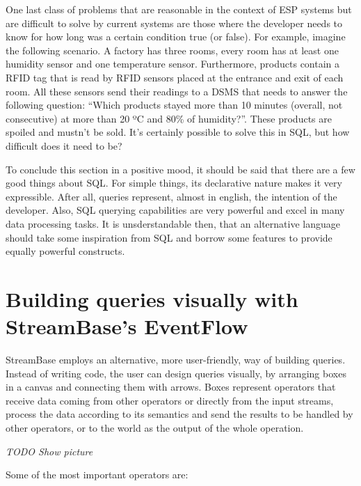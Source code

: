 \documentclass{report}
\begin{document}
One last class of problems that are reasonable in the context of ESP systems but are difficult to solve by current systems are those where the developer needs to know for how long was a certain condition true (or false). For example, imagine the following scenario. A factory has three rooms, every room has at least one humidity sensor and one temperature sensor. Furthermore, products contain a RFID tag that is read by RFID sensors placed at the entrance and exit of each room. All these sensors send their readings to a DSMS that needs to answer the following question: ``Which products stayed more than 10 minutes (overall, not consecutive) at more than 20 ºC and 80\% of humidity?''. These products are spoiled and mustn't be sold. It's certainly possible to solve this in SQL, but how difficult does it need to be?

To conclude this section in a positive mood, it should be said that there are a few good things about SQL. For simple things, its declarative nature makes it very expressible. After all, queries represent, almost in english, the intention of the developer. Also, SQL querying capabilities are very powerful and excel in many data processing tasks. It is unsderstandable then, that an alternative language should take some inspiration from SQL and borrow some features to provide equally powerful constructs.

\section{Building queries visually with StreamBase's EventFlow}

StreamBase employs an alternative, more user-friendly, way of building queries. Instead of writing code, the user can design queries visually, by arranging boxes in a canvas and connecting them with arrows. Boxes represent operators that receive data coming from other operators or directly from the input streams, process the data according to its semantics and send the results to be handled by other operators, or to the world as the output of the whole operation.

\emph{TODO Show picture}

Some of the most important operators are:
\end{document}

